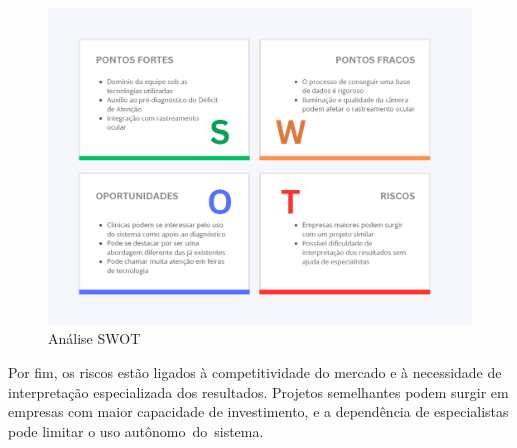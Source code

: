 \documentclass[
  a4paper,%
  12pt,%
  english,%
  brazilian,%
]{article}
\begin{document}
\begin{figure}[H]
\centering
\caption{Análise SWOT}%
\label{fig:analise-swot}
\includegraphics[width=1.1\textwidth]{Logos/swot.png}
\end{figure}

    Por fim, os riscos estão ligados à competitividade do mercado e à necessidade de interpretação especializada dos resultados. Projetos semelhantes podem surgir em empresas com maior capacidade de investimento, e a dependência de especialistas pode limitar o uso autônomo do sistema.
\end{document}
